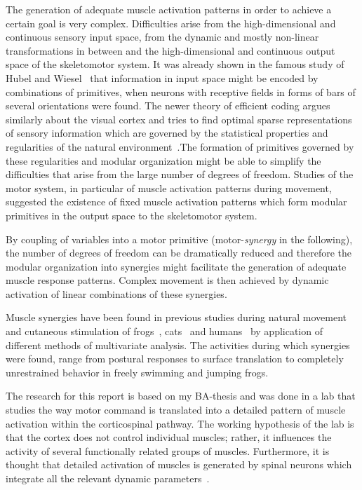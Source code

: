 \documentclass[a4paper]{article}
\begin{document}
The generation of adequate muscle activation patterns in order to achieve a certain goal is very complex. Difficulties arise from the high-dimensional and continuous sensory input space, from the dynamic and mostly non-linear transformations in between and the high-dimensional and continuous output space of the skeletomotor system. It was already shown in the famous study of Hubel and Wiesel~\cite{Hubel:1959p3833} that information in input space might be encoded by combinations of primitives, when neurons with receptive fields in forms of bars of several orientations were found. The newer theory of efficient coding argues similarly about the visual cortex and tries to find optimal sparse representations of sensory information which are governed by the statistical properties and regularities of the natural environment~\cite{Olshausen:1996p3611}.The formation of primitives governed by these regularities and modular organization might be able to simplify the difficulties that arise from the large number of degrees of freedom. Studies of the motor system, in particular of muscle activation patterns during movement, suggested the existence of fixed muscle activation patterns which form modular primitives in the output space to the skeletomotor system. 

By coupling of variables into a motor primitive (motor-\emph{synergy} in the following), the number of degrees of freedom can be dramatically reduced and therefore the modular organization into synergies might facilitate the generation of adequate muscle response patterns. Complex movement is then achieved by dynamic activation of linear combinations of these synergies.

Muscle synergies have been found in previous studies during natural movement and cutaneous stimulation of frogs~\cite{Tresch:1999p3783,Hart:2004p3786,Davella:2003p3784,Cheung:2005p3778}, cats~\cite{Ting:2004p3785} and humans~\cite{Merkle:1998p3780,Weiss:2004p3782,Krishnamoorthy:2003p3787,Olree:1995p3781,Ivanenko:2003p3779} by application of different methods of multivariate analysis. The activities during which synergies were found, range from postural responses to surface translation to completely unrestrained behavior in freely swimming and jumping frogs.

The research for this report is based on my BA-thesis and was done in a lab that studies the way motor command is translated into a detailed pattern of muscle activation within the corticospinal pathway. The working hypothesis of the lab is that the cortex does not control individual muscles; rather, it influences the activity of several functionally related groups of muscles. Furthermore, it is thought that detailed activation of muscles is generated by spinal neurons which integrate all the relevant dynamic parameters~\cite{yifat}.
\end{document}
